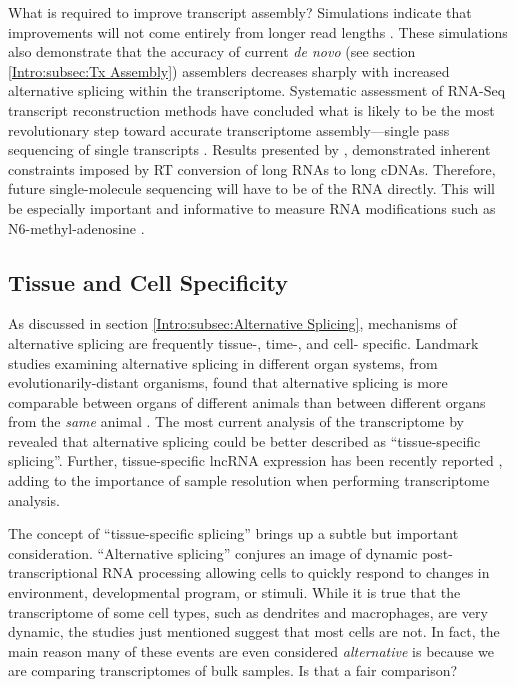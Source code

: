     What is required to improve transcript assembly? Simulations indicate that improvements will not come entirely from longer read lengths \citep{Chang2014c}. These simulations also demonstrate that the accuracy of current \textit{de novo} (see section \ref{Intro:subsec:Tx Assembly}) assemblers decreases sharply with increased alternative splicing within the transcriptome. Systematic assessment of RNA-Seq transcript reconstruction methods have concluded what is likely to be the most revolutionary step toward accurate transcriptome assembly---single pass sequencing of single transcripts \citep{Engstrom2013,Steijger2013}. Results presented by \citep{Sharon2013}, demonstrated inherent constraints imposed by  RT conversion of long RNAs to long cDNAs. Therefore, future single-molecule sequencing will have to be of the RNA directly. This will be especially important and informative to measure RNA modifications such as N6-methyl-adenosine \citep{Pan2013}.

  \subsection{Tissue and Cell Specificity}
    \label{Disc:subsec:Tissue-specific Tx expression}

    As discussed in section \ref{Intro:subsec:Alternative Splicing}, mechanisms of alternative splicing are frequently tissue-, time-, and cell- specific. Landmark studies examining alternative splicing in different organ systems, from evolutionarily-distant organisms, found that alternative splicing is more comparable between organs of different animals than between different organs from the \textit{same} animal \citep{Barbosa-Morais2012,Merkin2012}. The most current analysis of the \flies{} transcriptome by \citet{Brown2014} revealed that alternative splicing could be better described as ``tissue-specific splicing''. Further, tissue-specific lncRNA expression has been recently reported \citep{Washietl2014}, adding to the importance of sample resolution when performing transcriptome analysis.

    The concept of ``tissue-specific splicing'' brings up a subtle but important consideration. ``Alternative splicing'' conjures an image of dynamic post-transcriptional RNA processing allowing cells to quickly respond to changes in environment, developmental program, or stimuli. While it is true that the transcriptome of some cell types, such as dendrites and macrophages, are very dynamic, the studies just mentioned suggest that most cells are not. In fact, the main reason many of these events are even considered \textit{alternative} is because we are comparing transcriptomes of bulk samples. Is that a fair comparison?

